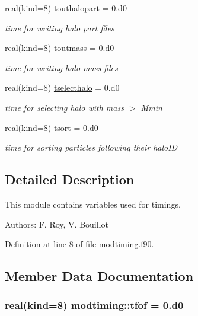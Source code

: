 \begin{DoxyCompactItemize}
real(kind=8) \hyperlink{classmodtiming_ac41b305f5582ff3ca37058380003cfc7}{touthalopart} = 0.d0
\begin{DoxyCompactList}\small\item\em time for writing halo part files \end{DoxyCompactList}\item 
real(kind=8) \hyperlink{classmodtiming_a03a912e0243fcfbdec3ceeae3a34963a}{toutmass} = 0.d0
\begin{DoxyCompactList}\small\item\em time for writing halo mass files \end{DoxyCompactList}\item 
real(kind=8) \hyperlink{classmodtiming_a0e46279061d4681c9c8b5a055410f04b}{tselecthalo} = 0.d0
\begin{DoxyCompactList}\small\item\em time for selecting halo with mass $>$ Mmin \end{DoxyCompactList}\item 
real(kind=8) \hyperlink{classmodtiming_a32142e111b00eb8590746eef1b1d9dd6}{tsort} = 0.d0
\begin{DoxyCompactList}\small\item\em time for sorting particles following their halo\-I\-D \end{DoxyCompactList}\end{DoxyCompactItemize}


\subsection{Detailed Description}
This module contains variables used for timings. 

Authors\-: F. Roy, V. Bouillot 

Definition at line 8 of file modtiming.\-f90.



\subsection{Member Data Documentation}
\hypertarget{classmodtiming_ac6dbf200ea4d6d6248bb9df21ed8d2a7}{
\subsubsection[{tfof}]{\setlength{\rightskip}{0pt plus 5cm}real(kind=8) modtiming\-::tfof = 0.d0}}\label{classmodtiming_ac6dbf200ea4d6d6248bb9df21ed8d2a7}


